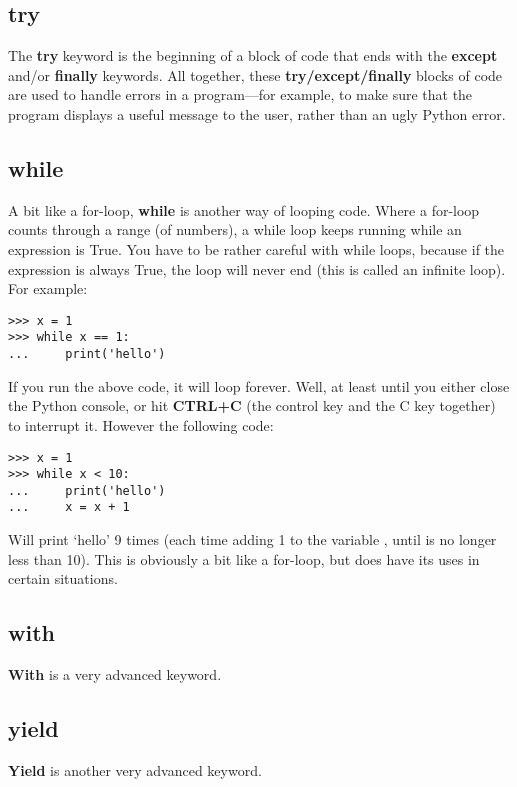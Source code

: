 \subsection*{try}

The \textbf{try} keyword is the beginning of a block of code that ends with the \textbf{except} and/or \textbf{finally} keywords.  All together, these \textbf{try/except/finally} blocks of code are used to handle errors in a program---for example, to make sure that the program displays a useful message to the user, rather than an ugly Python error.

\subsection*{while}

A bit like a for-loop, \textbf{while} is another way of looping code.  Where a for-loop counts through a range (of numbers), a while loop keeps running while an expression is True.  You have to be rather careful with while loops, because if the expression is always True, the loop will never end (this is called an infinite loop).  For example:

\begin{Verbatim}[frame=single]
>>> x = 1
>>> while x == 1:
...     print('hello')
\end{Verbatim}

If you run the above code, it will loop forever.  Well, at least until you either close the Python console, or hit \textbf{CTRL+C} (the control key and the C key together) to interrupt it. However the following code:

\begin{Verbatim}[frame=single]
>>> x = 1
>>> while x < 10:
...     print('hello')
...     x = x + 1
\end{Verbatim}

Will print `hello' 9 times (each time adding 1 to the variable , until  is no longer less than 10). This is obviously a bit like a for-loop, but does have its uses in certain situations.

\subsection*{with}

\textbf{With} is a very advanced keyword.

\subsection*{yield}
\textbf{Yield} is another very advanced keyword.

\newpage
